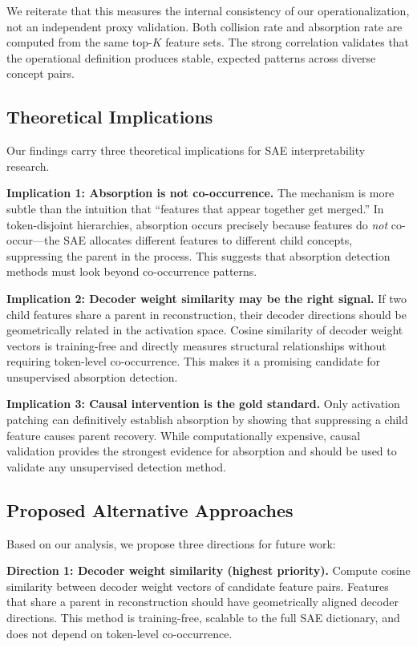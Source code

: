 \documentclass{article}
\begin{document}
We reiterate that this measures the internal consistency of our operationalization, not an independent proxy validation. Both collision rate and absorption rate are computed from the same top-$K$ feature sets. The strong correlation validates that the operational definition produces stable, expected patterns across diverse concept pairs.

\subsection{Theoretical Implications}

Our findings carry three theoretical implications for SAE interpretability research.

\textbf{Implication 1: Absorption is not co-occurrence.}
The mechanism is more subtle than the intuition that ``features that appear together get merged.'' In token-disjoint hierarchies, absorption occurs precisely because features do \emph{not} co-occur---the SAE allocates different features to different child concepts, suppressing the parent in the process. This suggests that absorption detection methods must look beyond co-occurrence patterns.

\textbf{Implication 2: Decoder weight similarity may be the right signal.}
If two child features share a parent in reconstruction, their decoder directions should be geometrically related in the activation space. Cosine similarity of decoder weight vectors is training-free and directly measures structural relationships without requiring token-level co-occurrence. This makes it a promising candidate for unsupervised absorption detection.

\textbf{Implication 3: Causal intervention is the gold standard.}
Only activation patching can definitively establish absorption by showing that suppressing a child feature causes parent recovery. While computationally expensive, causal validation provides the strongest evidence for absorption and should be used to validate any unsupervised detection method.

\subsection{Proposed Alternative Approaches}

Based on our analysis, we propose three directions for future work:

\textbf{Direction 1: Decoder weight similarity (highest priority).}
Compute cosine similarity between decoder weight vectors of candidate feature pairs. Features that share a parent in reconstruction should have geometrically aligned decoder directions. This method is training-free, scalable to the full SAE dictionary, and does not depend on token-level co-occurrence.
\end{document}
